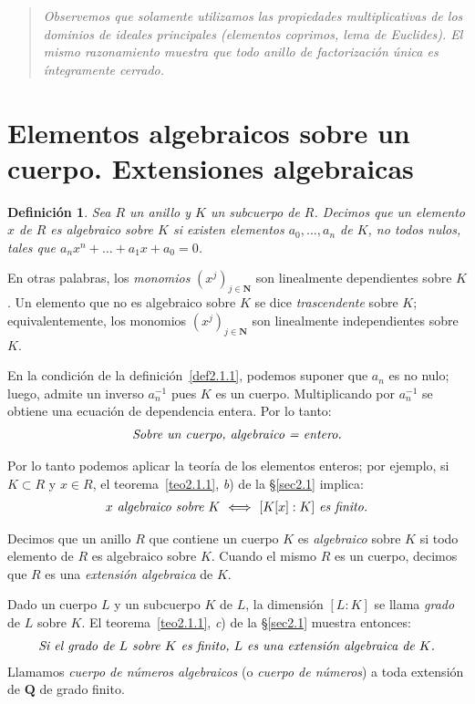 \documentclass[bibtotoc,leqno,spanish]{amsbook}
\newcommand{\QQ}{\mathbf{Q}}
\newcommand{\NN}{\mathbf{N}}
\numberwithin{equation}{section}
\newenvironment{comm}%
	{\begin{quotation}\itshape}
	{\end{quotation}}
\theoremstyle{note}
\newtheorem*{definition*}{Definici\'on}
\theoremstyle{note}
\theoremstyle{rem}
\numberwithin{theorem}{section}
\numberwithin{proposition}{section}
\numberwithin{definition}{section}
\numberwithin{lemma}{section}
\numberwithin{corollary}{section}
\numberwithin{example}{section}
\numberwithin{footnote}{section}%
\begin{document}
\begin{comm}
Observemos que solamente utilizamos las propiedades multiplicativas de los dominios de ideales principales
(elementos coprimos, lema de Euclides). El mismo razonamiento muestra que todo anillo de {\em factorizaci\'on
\'unica} es \'integramente cerrado.
\end{comm}

\section[Elementos algebraicos sobre un cuerpo]{Elementos algebraicos sobre un cuerpo. Extensiones algebraicas}
\label{sec2.3}

\begin{definition*}
Sea $R$ un anillo y $K$ un subcuerpo de $R$. Decimos que un elemento $x$ de $R$ es \emph{algebraico sobre $K$} si
existen elementos $a_{0},\dots,a_{n}$ de $K$, no todos nulos, tales que $a_{n}x^{n}+\dots+a_{1}x+a_{0}=0$.
\end{definition*}

En otras palabras, los {\em monomios} $(x^{j})_{j\in\NN}$ son linealmente dependientes sobre $K$.
Un elemento que no es algebraico sobre $K$ se dice {\em trascendente} sobre $K$; equivalentemente, los
monomios $(x^{j})_{j\in\NN}$ son linealmente independientes sobre $K$.

En la condici\'on de la definici\'on~\ref{def2.1.1},
podemos suponer que $a_{n}$ es no nulo; luego, admite un inverso
$a_{n}^{-1}$ pues $K$ es un cuerpo. Multiplicando por $a_{n}^{-1}$ se obtiene una
ecuaci\'on de dependencia entera. Por lo tanto:
\begin{gather}
\text{\itshape Sobre un cuerpo, algebraico = entero.}
\end{gather}

Por lo tanto podemos aplicar la teor\'ia de los elementos enteros; por ejemplo, si $K\subset R$ y $x\in R$,
el teorema~\ref{teo2.1.1}, {\itshape b}) de la \S\ref{sec2.1} implica:
\begin{gather}
\text{\itshape $x$ algebraico sobre $K$ $\iff$ $[K[x]:K]$ es finito.}
\end{gather}

Decimos que un anillo $R$ que contiene un cuerpo $K$ es {\em algebraico} sobre $K$ si todo elemento de $R$
es algebraico sobre $K$. Cuando el mismo $R$ es un cuerpo, decimos que $R$ es una {\em extensi\'on algebraica}
de $K$.

Dado un cuerpo $L$ y un subcuerpo $K$ de $L$, la dimensi\'on $[L:K]$ se llama {\em grado} de $L$ sobre $K$.
El teorema~\ref{teo2.1.1}, {\itshape c}) de la \S\ref{sec2.1} muestra entonces:
\begin{gather}
\text{\itshape Si el grado de $L$ sobre $K$ es finito, $L$ es una extensi\'on algebraica de $K$.}
\end{gather}
Llamamos {\em cuerpo de n\'umeros algebraicos} (o {\em cuerpo de n\'umeros}) a toda extensi\'on de $\QQ$
de grado finito.
\end{document}
